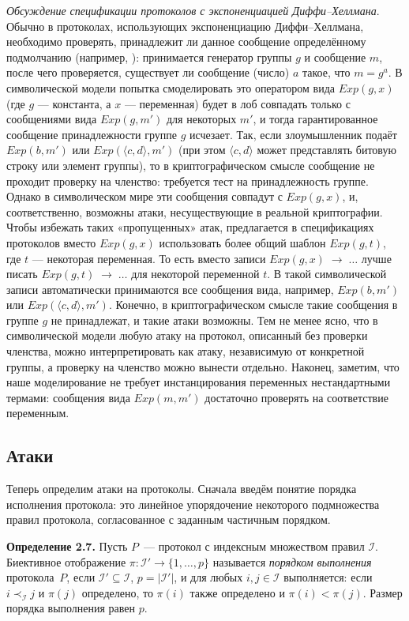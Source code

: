 \textit{Обсуждение спецификации протоколов с экспоненциацией Диффи–Хеллмана}. Обычно в протоколах, использующих экспоненциацию Диффи–Хеллмана, необходимо проверять, принадлежит ли данное сообщение определённому подмолчанию (например, \cite{SteinerTsudikWaidner1998}): принимается генератор группы $g$ и сообщение $m$, после чего проверяется, существует ли сообщение (число) $a$ такое, что $m=g^{a}$. В символической модели попытка смоделировать это оператором вида $Exp(g,x)$ (где $g$ — константа, а $x$ — переменная) будет в лоб совпадать только с сообщениями вида $Exp(g,m')$ для некоторых $m'$, и тогда гарантированное сообщение принадлежности группе $g$ исчезает. Так, если злоумышленник подаёт $Exp(b,m')$ или $Exp(\langle c,d\rangle,m')$ (при этом $\langle c,d\rangle$ может представлять битовую строку или элемент группы), то в криптографическом смысле сообщение не проходит проверку на членство: требуется тест на принадлежность группе. Однако в символическом мире эти сообщения совпадут с $Exp(g,x)$, и, соответственно, возможны атаки, несуществующие в реальной криптографии. 
Чтобы избежать таких «пропущенных» атак, предлагается в спецификациях протоколов вместо $Exp(g,x)$ использовать более общий шаблон $Exp(g,t)$, где $t$ — некоторая переменная. То есть вместо записи $Exp(g,x)\;\to\;\dots$ лучше писать $Exp(g,t)\;\to\;\dots$
для некоторой переменной $t$. В такой символической записи автоматически принимаются все сообщения вида, например, $Exp(b,m')$ или $Exp(\langle c,d\rangle,m')$. Конечно, в криптографическом смысле такие сообщения в группе $g$ не принадлежат, и такие атаки возможны. Тем не менее ясно, что в символической модели любую атаку на протокол, описанный без проверки членства, можно интерпретировать как атаку, независимую от конкретной группы, а проверку на членство можно вынести отдельно. Наконец, заметим, что наше моделирование не требует инстанцирования переменных нестандартными термами: сообщения вида $Exp(m,m')$ достаточно проверять на соответствие переменным.

\subsection{Атаки}

Теперь определим атаки на протоколы. Сначала введём понятие порядка исполнения протокола: это линейное упорядочение некоторого подмножества правил протокола, согласованное с заданным частичным порядком.

\medskip
\noindent\textbf{Определение 2.7.} Пусть \(P\)~— протокол с индексным множеством правил \(\mathcal{I}\). Биективное отображение
$\pi\colon \mathcal{I}' \to \{1,\dots,p\}$ называется \emph{порядком выполнения} протокола~\(P\), если \(\mathcal{I}'\subseteq \mathcal{I}\), \(p=|\mathcal{I}'|\), и для любых \(i,j\in \mathcal{I}\) выполняется: если \(i\prec_{\mathcal{I}} j\) и \(\pi(j)\) определено, то \(\pi(i)\) также определено и \(\pi(i)<\pi(j)\). Размер порядка выполнения равен \(p\).

